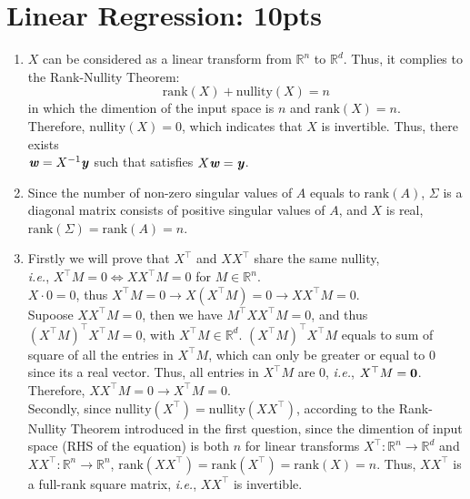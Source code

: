 \documentclass[12pt]{article}
\begin{document}
\section{Linear Regression: 10pts}
\begin{enumerate}
    \item $X$ can be considered as a linear transform from $\mathbb{R}^n$ to 
    $\mathbb{R}^d$. Thus, it complies to the Rank-Nullity Theorem: 
    \[\text{rank}(X) + \text{nullity}(X) = n\]
    in which the dimention of the input space is $n$ and $\text{rank}(X) = n$.\\
    Therefore, $\text{nullity}(X) = 0$, which indicates that $X$ is invertible. Thus,
    there exists\\ $\textbf{\textit{w}} = X^{-1}\textbf{\textit{y}}$ such that satisfies
    $X\textbf{\textit{w}} = \textbf{\textit{y}}$.
    \item Since the number of non-zero singular values of $A$ equals to $\text{rank}(A)$, 
    $\Sigma$ is a diagonal matrix consists of positive singular values of $A$, and $X$
    is real, $\text{rank}(\Sigma) = \text{rank}(A) = n$.
    \item Firstly we will prove that $X^{\top}$ and $XX^{\top}$ share the same nullity,\\
    \textit{i.e.}, $X^{\top}M = 0 \iff XX^{\top}M = 0$ for $M \in \mathbb{R}^n$.\\
    $X \cdot 0 = 0$, thus $X^{\top}M = 0 \rightarrow X(X^{\top}M) = 0 \rightarrow XX^{\top}M = 0$.
    \\Supoose $XX^{\top}M = 0$, then we have $M^{\top}XX^{\top}M = 0$, and thus
    $(X^{\top}M)^{\top}X^{\top}M = 0$, with $X^{\top}M \in \mathbb{R}^d$.
    $(X^{\top}M)^{\top}X^{\top}M$ equals to sum of square of all the entries in $X^{\top}M$,
    which can only be greater or equal to 0 since its a real vector. Thus, all entries in
    $X^{\top}M$ are 0, \textit{i.e.}, $X^{\top}M = \bf{0}$. Therefore, 
    $XX^{\top}M = 0 \rightarrow X^{\top}M = 0$.\\
    Secondly, since $\text{nullity}(X^{\top}) = \text{nullity}(XX^{\top})$, according to the 
    Rank-Nullity Theorem introduced in the first question, since the dimention of input space
    (RHS of the equation) is both $n$ for linear transforms
    $X^{\top}:\mathbb{R}^n \rightarrow \mathbb{R}^d$ and 
    $XX^{\top}: \mathbb{R}^n \rightarrow \mathbb{R}^n$, 
    $\text{rank}(XX^{\top}) = \text{rank}(X^{\top}) = \text{rank}(X) = n$. 
    Thus, $XX^{\top}$ is a full-rank square matrix, \textit{i.e.}, $XX^{\top}$ is invertible.
\end{enumerate}
\end{document}
